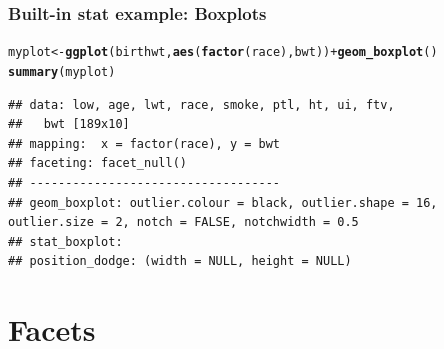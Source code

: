 \documentclass{beamer}\usepackage[]{graphicx}\usepackage[]{color}
\makeatletter
\newcommand{\hlopt}[1]{\textcolor[rgb]{0,0,0}{#1}}%
\newcommand{\hlstd}[1]{\textcolor[rgb]{0.345,0.345,0.345}{#1}}%
\newcommand{\hlkwb}[1]{\textcolor[rgb]{0.69,0.353,0.396}{#1}}%
\newcommand{\hlkwd}[1]{\textcolor[rgb]{0.737,0.353,0.396}{\textbf{#1}}}%
\newenvironment{kframe}{%
 \def\at@end@of@kframe{}%
 \ifinner\ifhmode%
  \def\at@end@of@kframe{\end{minipage}}%
  \begin{minipage}{\columnwidth}%
 \fi\fi%
 \def\FrameCommand##1{\hskip\@totalleftmargin \hskip-\fboxsep
 \colorbox{shadecolor}{##1}\hskip-\fboxsep
     \hskip-\linewidth \hskip-\@totalleftmargin \hskip\columnwidth}%
 \MakeFramed {\advance\hsize-\width
   \@totalleftmargin\z@ \linewidth\hsize
   \@setminipage}}%
 {\par\unskip\endMakeFramed%
 \at@end@of@kframe}
\newenvironment{knitrout}{}{} %
\makeatother
\begin{document}

\begin{frame}[fragile]
\frametitle{Built-in stat example: Boxplots}
\begin{knitrout}\footnotesize
{}\color{fgcolor}\begin{kframe}
\begin{alltt}
\hlstd{myplot} \hlkwb{<-} \hlkwd{ggplot}\hlstd{(birthwt,} \hlkwd{aes}\hlstd{(}\hlkwd{factor}\hlstd{(race), bwt))} \hlopt{+} \hlkwd{geom_boxplot}\hlstd{()}
\hlkwd{summary}\hlstd{(myplot)}
\end{alltt}
\begin{verbatim}
## data: low, age, lwt, race, smoke, ptl, ht, ui, ftv,
##   bwt [189x10]
## mapping:  x = factor(race), y = bwt
## faceting: facet_null() 
## -----------------------------------
## geom_boxplot: outlier.colour = black, outlier.shape = 16, outlier.size = 2, notch = FALSE, notchwidth = 0.5 
## stat_boxplot:  
## position_dodge: (width = NULL, height = NULL)
\end{verbatim}
\end{kframe}
\end{knitrout}

\end{frame}


\section*{Facets}
\frame{\sectionpage}

\end{document}
